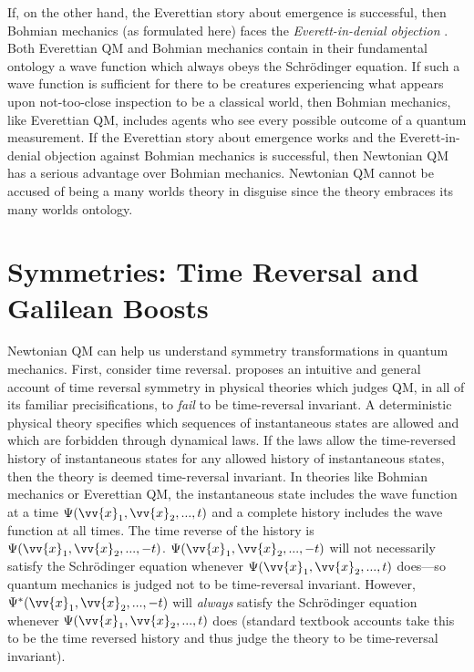 \documentclass[12pt,secnumarabic,balancelastpage,amsmath,amssymb,nofootinbib]{article}
\begin{document}
If, on the other hand, the Everettian story about emergence is successful, then Bohmian mechanics (as formulated here) faces the \emph{Everett-in-denial objection} \citep{deutsch1996lockwood,brown2005,valentini2010}.  Both Everettian QM and Bohmian mechanics contain in their fundamental ontology a wave function which always obeys the Schr\"{o}dinger equation.  If such a wave function is sufficient for there to be creatures experiencing what appears upon not-too-close inspection to be a classical world, then Bohmian mechanics, like Everettian QM, includes agents who see every possible outcome of a quantum measurement.  If the Everettian story about emergence works and the Everett-in-denial objection against Bohmian mechanics is successful, then Newtonian QM has a serious advantage over Bohmian mechanics.  Newtonian QM cannot be accused of being a many worlds theory in disguise since the theory embraces its many worlds ontology.

\section{Symmetries: Time Reversal and Galilean Boosts}\label{sym}

Newtonian QM can help us understand symmetry transformations in quantum mechanics.  First, consider time reversal.  \citet{albert2000} proposes an intuitive and general account of time reversal symmetry in physical theories which judges QM, in all of its familiar precisifications, to \emph{fail} to be time-reversal invariant.  A deterministic physical theory specifies which sequences of instantaneous states are allowed and which are forbidden through dynamical laws.  If the laws allow the time-reversed history of instantaneous states for any allowed history of instantaneous states, then the theory is deemed time-reversal invariant.  In theories like Bohmian mechanics or Everettian QM, the instantaneous state includes the wave function at a time $\Psi(\vv{x}_1,\vv{x}_2,...,t)$ and a complete history includes the wave function at all times.  The time reverse of the history is $\Psi(\vv{x}_1,\vv{x}_2,...,-t)$.  $\Psi(\vv{x}_1,\vv{x}_2,...,-t)$ will not necessarily satisfy the Schr\"{o}dinger equation whenever $\Psi(\vv{x}_1,\vv{x}_2,...,t)$ does---so quantum mechanics is judged not to be time-reversal invariant.  However, $\Psi^*(\vv{x}_1,\vv{x}_2,...,-t)$ will \emph{always} satisfy the Schr\"{o}dinger equation whenever $\Psi(\vv{x}_1,\vv{x}_2,...,t)$ does (standard textbook accounts take this to be the time reversed history and thus judge the theory to be time-reversal invariant).
\end{document}
